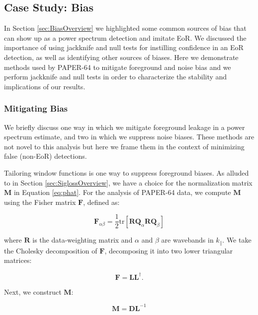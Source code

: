 \documentclass[preprint2,numberedappendix,tighten]{aastex6}  %
\begin{document}
\subsection{Case Study: Bias}
\label{sec:Bias}

In Section \ref{sec:BiasOverview} we highlighted some common sources of bias that can show up as a power spectrum detection and imitate EoR. We discussed the importance of using jackknife and null tests for instilling confidence in an EoR detection, as well as identifying other sources of biases. Here we demonstrate methods used by PAPER-64 to mitigate foreground and noise bias and we perform jackknife and null tests in order to characterize the stability and implications of our results.

\subsubsection{Mitigating Bias}

We briefly discuss one way in which we mitigate foreground leakage in a power spectrum estimate, and two in which we suppress noise biases. These methods are not novel to this analysis but here we frame them in the context of minimizing false (non-EoR) detections.

Tailoring window functions is one way to suppress foreground biases. As alluded to in Section \ref{sec:SiglossOverview}, we have a choice for the normalization matrix $\textbf{M}$ in Equation \ref{eq:phat}. For the analysis of PAPER-64 data, we compute $\textbf{M}$ using the Fisher matrix $\textbf{F}$, defined as:

\begin{equation}
\textbf{F}_{\alpha\beta} = \frac{1}{2} \text{tr} [\textbf{R}\textbf{Q}_{\alpha}\textbf{R}\textbf{Q}_{\beta} ]
\end{equation}

\noindent where $\textbf{R}$ is the data-weighting matrix and $\alpha$ and $\beta$ are wavebands in $k_{\parallel}$. We take the Cholesky decomposition of $\textbf{F}$, decomposing it into two lower triangular matrices:

\begin{equation}
\textbf{F} = \textbf{LL}^{\dagger}.
\end{equation}

\noindent Next, we construct $\textbf{M}$:

\begin{equation}
\textbf{M} = \textbf{DL}^{-1}
\end{equation}
\end{document}
